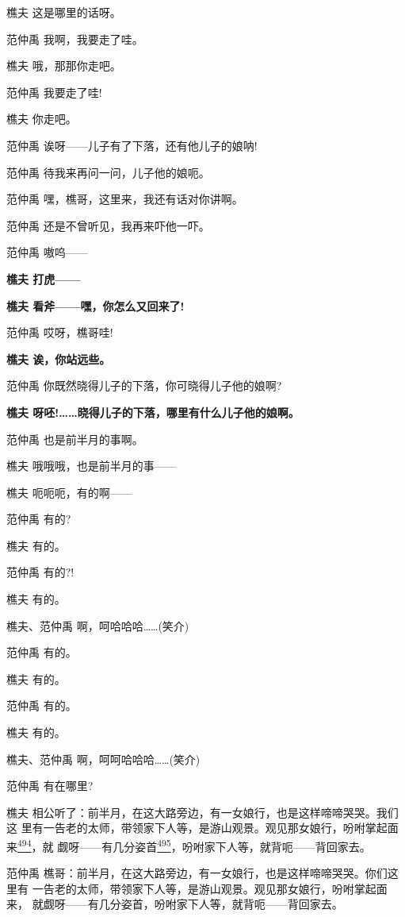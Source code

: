 樵夫 这是哪里的话呀。

范仲禹 我啊，我要走了哇。

樵夫 哦，那那你走吧。

范仲禹 我要走了哇!

樵夫 你走吧。

范仲禹 诶呀------儿子有了下落，还有他儿子的娘呐!

范仲禹 待我来再问一问，儿子他的娘呃。

范仲禹 嘿，樵哥，这里来，我还有话对你讲啊。

范仲禹 还是不曾听见，我再来吓他一吓。

范仲禹 嗷呜------

\textbf{樵夫 打虎------}

\textbf{樵夫 看斧------嘿，你怎么又回来了!}

范仲禹 哎呀，樵哥哇!

\textbf{樵夫 诶，你站远些。}

范仲禹 你既然晓得儿子的下落，你可晓得儿子他的娘啊?

\textbf{樵夫
呀呸!\ldots{}\ldots{}晓得儿子的下落，哪里有什么儿子他的娘啊。}

范仲禹 也是前半月的事啊。

樵夫 哦哦哦，也是前半月的事------

樵夫 呃呃呃，有的啊------

范仲禹 有的?

樵夫 有的。

范仲禹 有的?!

樵夫 有的。

樵夫、范仲禹 啊，呵哈哈哈\ldots{}\ldots{}(笑介)

范仲禹 有的。

樵夫 有的。

范仲禹 有的。

樵夫 有的。

樵夫、范仲禹 啊，呵呵哈哈哈\ldots{}\ldots{}(笑介)

范仲禹 有在哪里?

樵夫
相公听了：前半月，在这大路旁边，有一女娘行，也是这样啼啼哭哭。我们这
里有一告老的太师，带领家下人等，是游山观景。观见那女娘行，吩咐掌起面
来\protect\hyperlink{fn494}{\textsuperscript{494}}，就
觑呀------有几分姿首\protect\hyperlink{fn495}{\textsuperscript{495}}，吩咐家下人等，就背呃------背回家去。

范仲禹
樵哥：前半月，在这大路旁边，有一女娘行，也是这样啼啼哭哭。你们这里有
一告老的太师，带领家下人等，是游山观景。观见那女娘行，吩咐掌起面来，
就觑呀------有几分姿首，吩咐家下人等，就背呃------背回家去。

